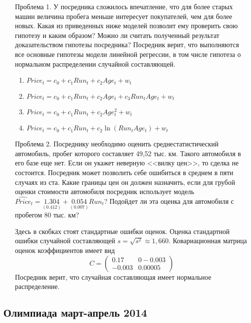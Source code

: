 \documentclass[pdftex,12pt,a4paper]{article}
\begin{document}
\begin{enumerate}
\begin{enumerate}
\item[Проблема 1.] У посредника сложилось впечатление, что для более старых машин величина
пробега меньше интересует покупателей, чем для более новых. Какая из приведенных
ниже моделей позволит ему проверить свою гипотезу и каким образом? Можно ли считать
полученный результат доказательством гипотезы посредника? Посредник верит, что
выполняются все основные гипотезы модели линейной регрессии, в том числе гипотеза о
нормальном распределении случайной составляющей.
\begin{enumerate}
\item $Price_t=c_0+c_1 Run_t+c_2 Age_t+w_t$
\item $Price_t=c_0+c_1 Run_t+c_2 Age_t+c_3 Run_t Age_t+w_t$
\item $Price_t=c_0+c_1 Run_t+c_2 Age_t^2+w_t$
\item $Price_t=c_0+c_1 Run_t+c_2 \ln(Run_t Age_t)+w_t$
\end{enumerate}

\item[Проблема 2.] Посреднику необходимо оценить среднестатистический автомобиль, пробег
которого составляет 49,52 тыс. км. Такого автомобиля в его базе еще нет. Если он укажет
неверную <<вилку цен>>, то сделка не состоится. Посредник может позволить себе
ошибиться в среднем в пяти случаях из ста. Какие границы цен он должен назначить, если
для грубой оценки стоимости автомобиля посредник использует модель
$\widehat{Price}_t=\underset{(0.412)}{1.304}+\underset{(0.007)}{0.054}Run_t$? Подойдет ли эта оценка для автомобиля с пробегом 80 тыс. км?


Здесь в скобках стоят стандартные ошибки оценок. Оценка стандартной ошибки
случайной составляющей $s=\sqrt{s^2}\approx 1,660$. Ковариационная матрица оценок
коэффициентов имеет вид 
\[
C=\left(
\begin{array}{cc}
0.17 & 0 -0.003 \\
-0.003 & 0.00005
\end{array}
\right)
\]
Посредник верит, что случайная составляющая имеет нормальное распределение.
\end{enumerate}

\end{enumerate}


\subsection{Олимпиада март-апрель 2014}
\end{document}
